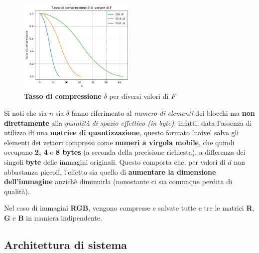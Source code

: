     \begin{figure}[h]
        \centering
        \includegraphics[width=0.5\textwidth]{images/compressione_rate_plot.png}
        \caption{\textbf{Tasso di compressione} $\delta$ per diversi valori di $F$}
        \label{fig:compression_rate_plot}
    \end{figure}
    Si noti che sia $n$ sia $\delta$ fanno riferimento al \textit{numero di elementi} dei blocchi ma \textbf{non direttamente} alla \textit{quantità di spazio effettivo (in byte)}: infatti, data l'assenza di utilizzo di una \textbf{matrice di quantizzazione}, questo formato 'naive' salva gli elementi dei vettori compressi come \textbf{numeri a virgola mobile}, che quindi occupano \textbf{2, 4} o \textbf{8 bytes} (a seconda della precisione richiesta), a differenza dei singoli \textbf{byte} delle immagini originali. Questo comporta che, per valori di $d$ non abbastanza piccoli, l'effetto sia quello di \textbf{aumentare la dimensione dell'immagine} anzichè diminuirla (nonostante ci sia comunque perdita di qualità).

    Nel caso di immagini \textbf{RGB}, vengono compresse e salvate tutte e tre le matrici \textbf{R}, \textbf{G} e \textbf{B} in maniera indipendente.
    
\subsection{Architettura di sistema} \label{subsection:software_architecture}

